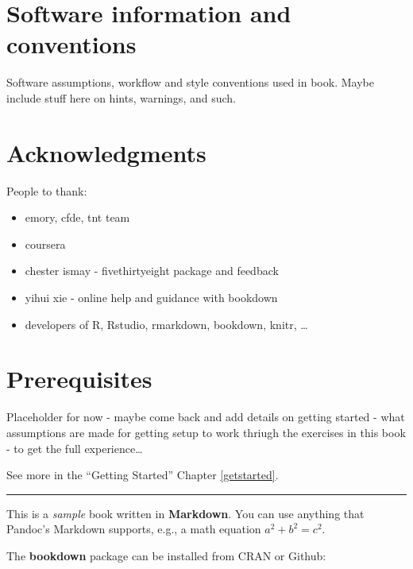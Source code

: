 \documentclass[]{book}
\providecommand{\tightlist}{%
  \setlength{\itemsep}{0pt}\setlength{\parskip}{0pt}}
\theoremstyle{definition}
\theoremstyle{definition}
\theoremstyle{definition}
\theoremstyle{remark}
\begin{document}
\section*{Software information and
conventions}\label{software-information-and-conventions}

Software assumptions, workflow and style conventions used in book. Maybe
include stuff here on hints, warnings, and such.

\section*{Acknowledgments}\label{acknowledgments}

People to thank:

\begin{itemize}
\tightlist
\item
  emory, cfde, tnt team
\item
  coursera
\item
  chester ismay - fivethirtyeight package and feedback
\item
  yihui xie - online help and guidance with bookdown
\item
  developers of R, Rstudio, rmarkdown, bookdown, knitr, \ldots{}
\end{itemize}

\section*{Prerequisites}\label{prerequisites}

Placeholder for now - maybe come back and add details on getting started
- what assumptions are made for getting setup to work thriugh the
exercises in this book - to get the full experience\ldots{}

See more in the ``Getting Started'' Chapter \ref{getstarted}.

\begin{center}\rule{0.5\linewidth}{\linethickness}\end{center}

This is a \emph{sample} book written in \textbf{Markdown}. You can use
anything that Pandoc's Markdown supports, e.g., a math equation
\(a^2 + b^2 = c^2\).

The \textbf{bookdown} package can be installed from CRAN or Github:
\end{document}
